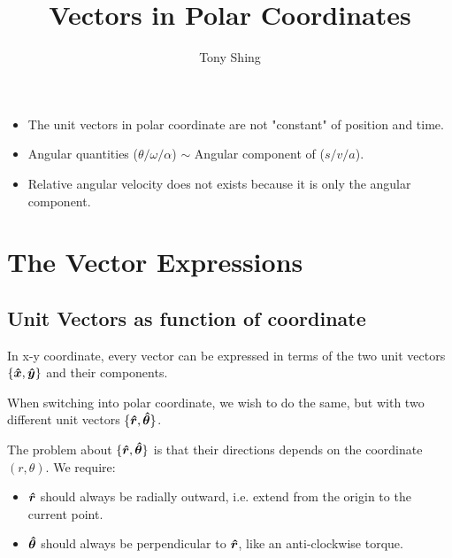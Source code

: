 \documentclass[class=article, crop=false, 12pt]{standalone}
\author{Tony Shing}
\title{Vectors in Polar Coordinates}
\begin{document}
\maketitle


\begin{overview}
    \begin{itemize}
        \item The unit vectors in polar coordinate are not "constant" of position and time.
        \item Angular quantities ($\theta/\omega/\alpha$) $\sim$ Angular component of ($s/v/a$). 
        \item Relative angular velocity does not exists because it is only the angular component.
    \end{itemize}
\end{overview}



\section{The Vector Expressions}

\subsection{Unit Vectors as function of coordinate}

In x-y coordinate, every vector can be expressed in terms of the two unit vectors $\{\vu*{x}, \vu*{y}\}$ and their components.

When switching into polar coordinate, we wish to do the same, 
but with two different unit vectors $\{\vu*{r}, \vu*{\theta}\}$.

The problem about $\{\vu*{r}, \vu*{\theta}\}$ is that their directions depends on the coordinate $(r, \theta)$. 
We require:
\begin{itemize}
    \item $\vu*{r}$ should always be radially outward, 
    i.e. extend from the origin to the current point.
    
    \item $\vu*{\theta}$ should always be perpendicular to $\vu*{r}$, 
    like an anti-clockwise torque. 
    
\end{itemize}
\end{document}
